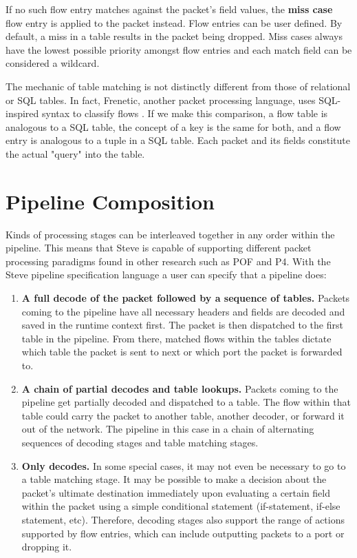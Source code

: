 If no such flow entry matches against the packet's field values, the \textbf{miss case} flow entry is applied to the packet instead. Flow entries can be user defined. By default, a miss in a table results in the packet being dropped. Miss cases always have the lowest possible priority amongst flow entries and each match field can be considered a wildcard.

The mechanic of table matching is not distinctly different from those of relational or SQL tables. In fact, Frenetic, another packet processing language, uses SQL-inspired syntax to classify flows \cite{foster2011frenetic, foster2013frenetic}. If we make this comparison, a flow table is analogous to a SQL table, the concept of a key is the same for both, and a flow entry is analogous to a tuple in a SQL table. Each packet and its fields constitute the actual "query" into the table.

\section{Pipeline Composition} \label{pipeline_comp_desc}

Kinds of processing stages can be interleaved together in any order within the pipeline. This means that Steve is capable of supporting different packet processing paradigms found in other research such as POF and P4. With the Steve pipeline specification language a user can specify that a pipeline does:

\begin{enumerate}
\item \textbf{A full decode of the packet followed by a sequence of tables.} Packets coming to the pipeline have all necessary headers and fields are decoded and saved in the runtime context first. The packet is then dispatched to the first table in the pipeline. From there, matched flows within the tables dictate which table the packet is sent to next or which port the packet is forwarded to.
\item \textbf{A chain of partial decodes and table lookups.} Packets coming to the pipeline get partially decoded and dispatched to a table. The flow within that table could carry the packet to another table, another decoder, or forward it out of the network. The pipeline in this case in a chain of alternating sequences of decoding stages and table matching stages.
\item \textbf{Only decodes.} In some special cases, it may not even be necessary to go to a table matching stage. It may be possible to make a decision about the packet’s ultimate destination immediately upon evaluating a certain field within the packet using a simple conditional statement (if-statement, if-else statement, etc). Therefore, decoding stages also support the range of actions supported by flow entries, which can include outputting packets to a port or dropping it.
\end{enumerate}

